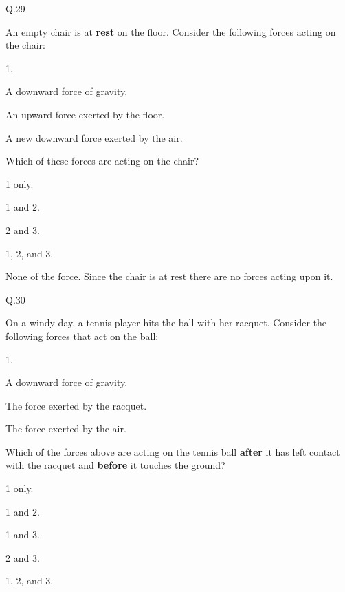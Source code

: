     \begin{mcq}{Q.29}{An empty chair is at \textbf{rest} on the floor. Consider the following forces acting on the chair:

        \eline[]
        \begin{options}{1.}
            \item A downward force of gravity.
            \item An upward force exerted by the floor.
            \item A new downward force exerted by the air.
        \end{options}
        \eline[]

        Which of these forces are acting on the chair?
    }
        \item 1 only.
        \item 1 and 2.
        \item 2 and 3.
        \item 1, 2, and 3.
        \item None of the force. Since the chair is at rest there are no forces acting upon it.
    \end{mcq}

    \begin{mcq}{Q.30}{On a windy day, a tennis player hits the ball with her racquet. Consider the following forces that act on the ball:

        \eline[]
        \begin{options}{1.}
            \item A downward force of gravity.
            \item The force exerted by the racquet.
            \item The force exerted by the air.
        \end{options}
        \eline[]

        Which of the forces above are acting on the tennis ball \textbf{after} it has left contact with the racquet and \textbf{before} it touches the ground?
    }
        \item 1 only.
        \item 1 and 2.
        \item 1 and 3.
        \item 2 and 3.
        \item 1, 2, and 3.
    \end{mcq}

    \vfill      %
    \theendnotes


